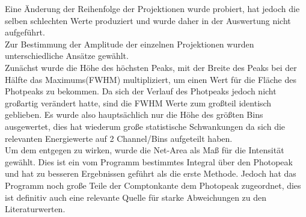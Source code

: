 Eine Änderung der Reihenfolge der Projektionen wurde probiert, hat jedoch die selben schlechten Werte produziert und wurde daher in der Auswertung nicht aufgeführt.\\
Zur Bestimmung der Amplitude der einzelnen Projektionen wurden unterschiedliche Ansätze gewählt.\\
Zunächst wurde die Höhe des höchsten Peaks, mit der Breite des Peaks bei der Hälfte das Maximums(FWHM) multipliziert, um einen Wert für die Fläche des Photpeaks zu bekommen.
Da sich der Verlauf des Photpeaks jedoch nicht großartig verändert hatte, sind die FWHM Werte zum großteil identisch geblieben. 
Es wurde also hauptsächlich nur die Höhe des größten Bins ausgewertet, dies hat wiederum große statistische Schwankungen da sich die relevanten Energiewerte auf 2 Channel/Bins aufgeteilt haben.\\
Um dem entgegen zu wirken, wurde die Net-Area als Maß für die Intensität gewählt. Dies ist ein vom Programm bestimmtes Integral über den Photopeak und hat zu besseren Ergebnissen geführt als die erste Methode.
Jedoch hat das Programm noch große Teile der Comptonkante dem Photopeak zugeordnet, dies ist definitiv auch eine relevante Quelle für starke Abweichungen zu den Literaturwerten.\\
